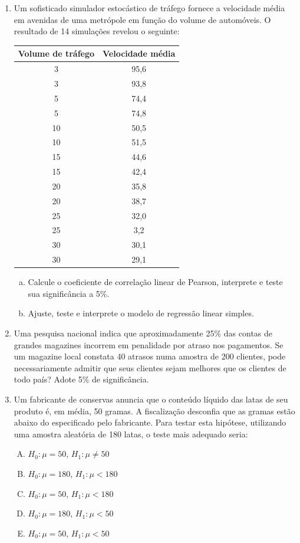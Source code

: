 \documentclass[12pt, a4paper]{article}
\begin{document}
\begin{enumerate}
\item Um sofisticado simulador estocástico de tráfego fornece a velocidade média em avenidas de uma metrópole em função do volume de automóveis. O resultado de 14 simulações revelou o seguinte:
\begin{center}
\begin{tabular}{|c|c|}
\hline
\textbf{Volume de tráfego} & \textbf{Velocidade média} \\
\hline
3 & 95,6 \\ 3 & 93,8 \\ 5 & 74,4 \\ 5 & 74,8 \\ 10 & 50,5 \\ 10 & 51,5 \\ 15 & 44,6 \\ 15 & 42,4 \\ 20 & 35,8 \\ 20 & 38,7 \\ 25 & 32,0 \\ 25 & 3,2 \\ 30 & 30,1 \\ 30 & 29,1 \\
\hline
\end{tabular}
\end{center}
\begin{enumerate}[a)]
    \item Calcule o coeficiente de correlação linear de Pearson, interprete e teste sua significância a 5\%.
    \item Ajuste, teste e interprete o modelo de regressão linear simples.
\end{enumerate}

\item Uma pesquisa nacional indica que aproximadamente 25\% das contas de grandes magazines incorrem em penalidade por atraso nos pagamentos. Se um magazine local constata 40 atrasos numa amostra de 200 clientes, pode necessariamente admitir que seus clientes sejam melhores que os clientes de todo país? Adote 5\% de significância.

\item Um fabricante de conservas anuncia que o conteúdo líquido das latas de seu produto é, em média, 50 gramas. A fiscalização desconfia que as gramas estão abaixo do especificado pelo fabricante. Para testar esta hipótese, utilizando uma amostra aleatória de 180 latas, o teste mais adequado seria:
\begin{enumerate}[A)]
    \item $H_0: \mu=50$, $H_1: \mu \neq 50$
    \item $H_0: \mu=180$, $H_1: \mu < 180$
    \item $H_0: \mu=50$, $H_1: \mu < 180$
    \item $H_0: \mu=180$, $H_1: \mu < 50$
    \item $H_0: \mu=50$, $H_1: \mu < 50$
\end{enumerate}


\end{enumerate}
\end{document}
